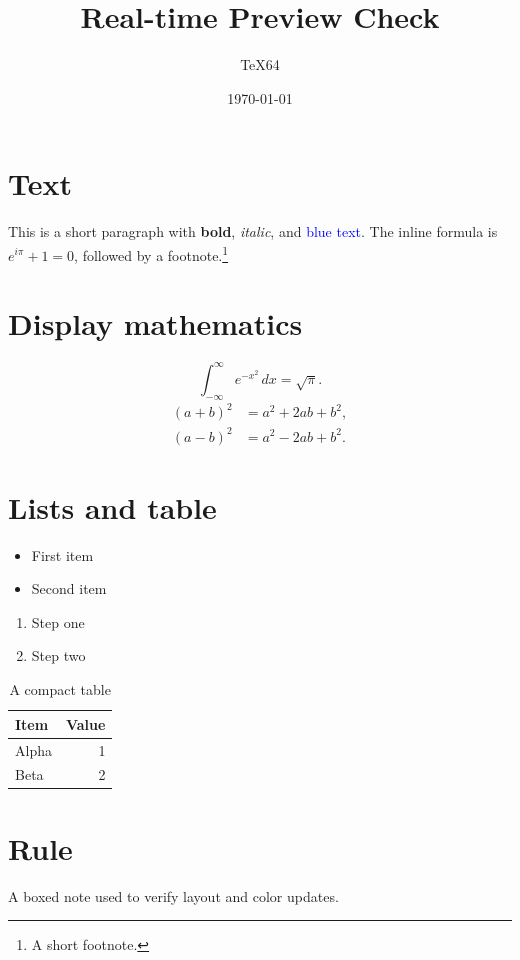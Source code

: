 \documentclass[a4paper,11pt]{article}
\title{Real-time Preview Check}
\author{TeX64}
\date{\today}
\begin{document}
\maketitle

\section{Text}
This is a short paragraph with \textbf{bold}, \textit{italic}, and \textcolor{blue}{blue text}.
The inline formula is $e^{i\pi}+1=0$, followed by a footnote.\footnote{A short footnote.}

\section{Display mathematics}
\begin{equation}
  \int_{-\infty}^{\infty} e^{-x^2}\,dx = \sqrt{\pi}.
\end{equation}
\begin{align}
  (a+b)^2 &= a^2+2ab+b^2, \\
  (a-b)^2 &= a^2-2ab+b^2.
\end{align}

\section{Lists and table}
\begin{itemize}
  \item First item
  \item Second item
\end{itemize}
\begin{enumerate}
  \item Step one
  \item Step two
\end{enumerate}

\begin{table}[h]
  \centering
  \begin{tabular}{lr}
    \toprule
    Item & Value \\
    \midrule
    Alpha & 1 \\
    Beta & 2 \\
    \bottomrule
  \end{tabular}
  \caption{A compact table}
\end{table}

\section{Rule}
\noindent\colorbox{yellow!25}{\parbox{0.9\linewidth}{A boxed note used to verify layout and color updates.}}
\end{document}
